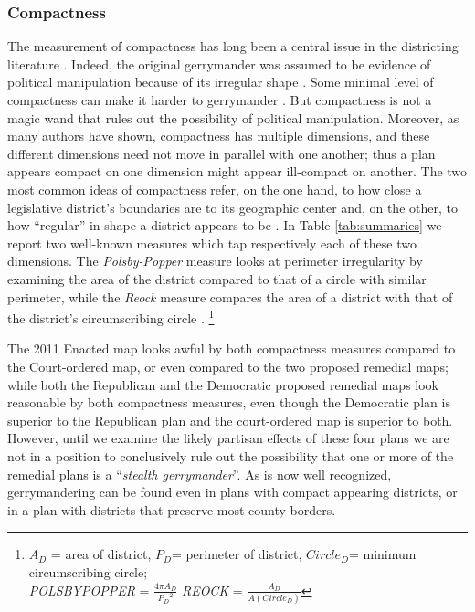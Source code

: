             \subsubsection*{Compactness}
    The measurement of compactness has long been a central issue in the districting literature \citep[see e.g.,][]{Reock1961, Niemi1990, Polsby1991, Webster2013, Kaufman2018}. Indeed, the original gerrymander was assumed to be evidence of political manipulation because of its irregular shape \citep{Martis2008}. Some minimal level of compactness can make it harder to gerrymander \citep[][cf. \citealt{Webster2013}]{Reock1961, Altman1998}. But compactness is not a magic wand that rules out the possibility of political manipulation. Moreover, as many authors have shown, compactness has multiple dimensions, and these different dimensions need not move in parallel with one another; thus a plan appears compact on one dimension might appear ill-compact on another. The two most common ideas of compactness refer, on the one hand, to how close a legislative district’s boundaries are to its geographic center and, on the other, to how ``regular'' in shape a district appears to be \citep{Niemi1990, Kaufman2018}. In Table \ref{tab:summaries} we report two well-known measures which tap respectively each of these two dimensions. The \textit{Polsby-Popper} measure looks at perimeter irregularity by examining the area of the district compared to that of a circle with similar perimeter, while the \textit{Reock} measure compares the area of a district with that of the district’s circumscribing circle \citep{Reock1961, Polsby1991}. 
        \footnote{$ A_D $ = area of district, $P_D$= perimeter of district, $Circle_D$= minimum circumscribing circle; \\
        \textit{POLSBYPOPPER} = $\frac{4 \pi A_D}{{P_{D}}^{2}}$ \quad
        \textit{REOCK} = $\frac{A_D}{A(Circle_D)}$}
\par
    The 2011 Enacted map looks awful by both compactness measures compared to the Court-ordered map, or even compared to the two proposed remedial maps; while both the Republican and the Democratic proposed remedial maps look reasonable by both compactness measures, even though the Democratic plan is superior to the Republican plan and the court-ordered map is superior to both. However, until we examine the likely partisan effects of these four plans we are not in a position to conclusively rule out the possibility that one or more of the remedial plans is a ``\textit{stealth gerrymander}''. As is now well recognized, gerrymandering can be found even in plans with compact appearing districts, or in a plan with districts that preserve most county borders.
